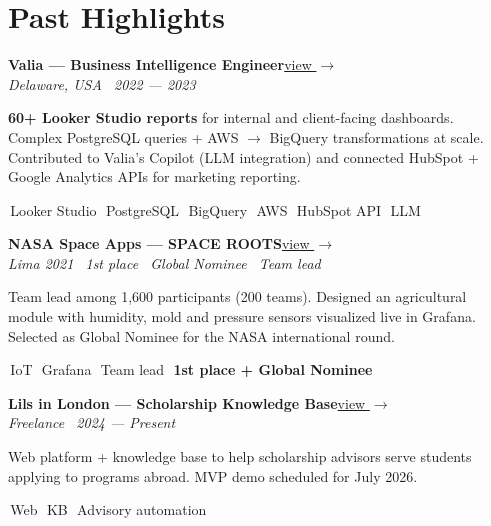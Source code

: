 \documentclass[10pt,letterpaper]{article}
\newcommand{\chip}[1]{%
  \colorbox{chip}{\textcolor{ink}{\footnotesize\,#1\,}}\hspace{1pt}
}
\newcommand{\pinkchip}[1]{%
  \colorbox{chip}{\textcolor{accent2}{\footnotesize\bfseries\,#1\,}}\hspace{1pt}
}
\newcommand{\projectcard}[5]{%
  \noindent\begin{minipage}{\linewidth}
    \textbf{\color{ink}#1}\hfill\textcolor{inkmute}{\small\href{#5}{view $\rightarrow$}}\\[-2pt]
    \textcolor{accent}{\small\itshape #2}\par
    \vspace{2pt}
    \textcolor{inkdim}{\small #3}\par
    \vspace{3pt}
    #4
  \end{minipage}\par\vspace{10pt}
}
\begin{document}
\vspace{6pt}
\section*{Past Highlights}

\projectcard{Valia --- Business Intelligence Engineer}%
  {Delaware, USA \textperiodcentered\ 2022 --- 2023}%
  {\textbf{60+ Looker Studio reports} for internal and client-facing dashboards.
   Complex PostgreSQL queries + AWS $\rightarrow$ BigQuery transformations at scale.
   Contributed to Valia's Copilot (LLM integration) and connected HubSpot + Google Analytics APIs for marketing reporting.}%
  {\chip{Looker Studio}\chip{PostgreSQL}\chip{BigQuery}\chip{AWS}\chip{HubSpot API}\chip{LLM}}%
  {https://edwinsantosv.github.io/portfolio-v2.github.io/}

\projectcard{NASA Space Apps --- SPACE ROOTS}%
  {Lima 2021 \textperiodcentered\ 1st place \textperiodcentered\ Global Nominee \textperiodcentered\ Team lead}%
  {Team lead among 1,600 participants (200 teams). Designed an agricultural module with humidity, mold and pressure sensors visualized live in Grafana. Selected as Global Nominee for the NASA international round.}%
  {\chip{IoT}\chip{Grafana}\chip{Team lead}\pinkchip{1st place + Global Nominee}}%
  {https://edwinsantosv.github.io/portfolio-v2.github.io/spaceapps.html}

\projectcard{Lils in London --- Scholarship Knowledge Base}%
  {Freelance \textperiodcentered\ 2024 --- Present}%
  {Web platform + knowledge base to help scholarship advisors serve students applying to programs abroad. MVP demo scheduled for July 2026.}%
  {\chip{Web}\chip{KB}\chip{Advisory automation}}%
  {https://edwinsantosv.github.io/portfolio-v2.github.io/scholarship_website.html}
\end{document}
